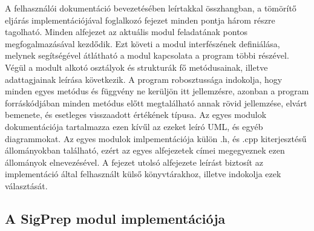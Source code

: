 \documentclass[oneside,titlepage,12pt,a4paper]{report}
\begin{document}
A felhasználói dokumentáció bevezetésében leírtakkal összhangban, a tömörítő eljárás implementációjával foglalkozó fejezet minden pontja három részre tagolható. Minden alfejezet az aktuális modul feladatának pontos megfogalmazásával kezdődik. Ezt követi a modul interfészének definiálása, melynek segítségével átlátható a modul kapcsolata a program többi részével. Végül a modult alkotó osztályok és strukturák fő metódusainak, illetve adattagjainak leírása következik. A program robosztussága indokolja, hogy minden egyes metódus és függvény ne kerüljön itt jellemzésre, azonban a program forráskódjában minden metódus előtt megtalálható annak rövid jellemzése, elvárt bemenete, és esetleges visszaadott értékének típusa. Az egyes modulok dokumentációja tartalmazza ezen kívűl az ezeket leíró UML, és egyéb diagrammokat. Az egyes modulok imlpementációja külön .h, és .cpp kiterjesztésű állományokban található, ezért az egyes alfejezetek címei megegyeznek ezen állományok elnevezésével. A fejezet utolsó alfejezete leírást biztosít az implementáció által felhasznált külső könyvtárakhoz, illetve indokolja ezek választását.

\subsection{A SigPrep modul implementációja}
\end{document}
